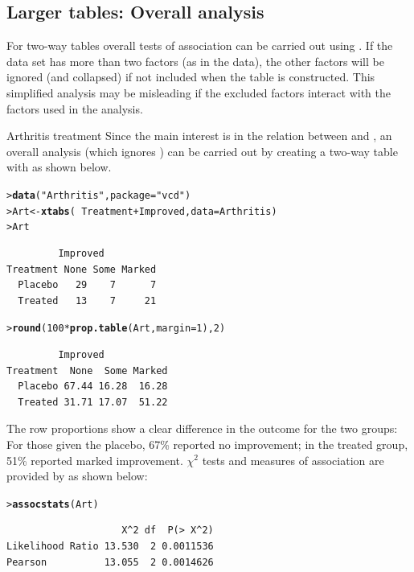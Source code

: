 \documentclass[10pt,krantz2]{krantz}\usepackage[]{graphicx}\usepackage[]{color}
\makeatletter
\newcommand{\hlnum}[1]{\textcolor[rgb]{0.686,0.059,0.569}{#1}}%
\newcommand{\hlstr}[1]{\textcolor[rgb]{0.192,0.494,0.8}{#1}}%
\newcommand{\hlopt}[1]{\textcolor[rgb]{0,0,0}{#1}}%
\newcommand{\hlstd}[1]{\textcolor[rgb]{0.345,0.345,0.345}{#1}}%
\newcommand{\hlkwb}[1]{\textcolor[rgb]{0.69,0.353,0.396}{#1}}%
\newcommand{\hlkwc}[1]{\textcolor[rgb]{0.333,0.667,0.333}{#1}}%
\newcommand{\hlkwd}[1]{\textcolor[rgb]{0.737,0.353,0.396}{\textbf{#1}}}%
\newenvironment{kframe}{%
 \def\at@end@of@kframe{}%
 \ifinner\ifhmode%
  \def\at@end@of@kframe{\end{minipage}}%
  \begin{minipage}{\columnwidth}%
 \fi\fi%
 \def\FrameCommand##1{\hskip\@totalleftmargin \hskip-\fboxsep
 \colorbox{shadecolor}{##1}\hskip-\fboxsep
     \hskip-\linewidth \hskip-\@totalleftmargin \hskip\columnwidth}%
 \MakeFramed {\advance\hsize-\width
   \@totalleftmargin\z@ \linewidth\hsize
   \@setminipage}}%
 {\par\unskip\endMakeFramed%
 \at@end@of@kframe}
\newenvironment{knitrout}{}{} %
\renewenvironment{knitrout}{\small\renewcommand{\baselinestretch}{.85}}{} %
\makeatother
\begin{document}
\subsection{Larger tables: Overall analysis}\label{sec:twoway-overall}

For two-way tables overall tests of association can be carried out
using .
If the data set has more than two factors (as in the
 data), the other factors will be
ignored (and collapsed) if not included when the table is constructed.
This simplified analysis may be misleading if
the excluded factors interact with the factors used in the
analysis.

\begin{Example}[arthrit2]{Arthritis treatment}
Since the main interest is in the relation between  and
, an overall analysis (which ignores ) can be carried out
by creating a two-way table with 
as shown below.
\begin{knitrout}
\color{fgcolor}\begin{kframe}
\begin{alltt}
\hlstd{> }\hlkwd{data}\hlstd{(}\hlstr{"Arthritis"}\hlstd{,} \hlkwc{package}\hlstd{=}\hlstr{"vcd"}\hlstd{)}
\hlstd{> }\hlstd{Art} \hlkwb{<-} \hlkwd{xtabs}\hlstd{(}\hlopt{~} \hlstd{Treatment} \hlopt{+} \hlstd{Improved,} \hlkwc{data} \hlstd{= Arthritis)}
\hlstd{> }\hlstd{Art}
\end{alltt}
\begin{verbatim}
         Improved
Treatment None Some Marked
  Placebo   29    7      7
  Treated   13    7     21
\end{verbatim}
\begin{alltt}
\hlstd{> }\hlkwd{round}\hlstd{(}\hlnum{100} \hlopt{*} \hlkwd{prop.table}\hlstd{(Art,} \hlkwc{margin} \hlstd{=} \hlnum{1}\hlstd{),} \hlnum{2}\hlstd{)}
\end{alltt}
\begin{verbatim}
         Improved
Treatment  None  Some Marked
  Placebo 67.44 16.28  16.28
  Treated 31.71 17.07  51.22
\end{verbatim}
\end{kframe}
\end{knitrout}
The row proportions show a clear difference in the outcome for the two groups:
For those given the placebo, 67\% reported no improvement;
in the treated group, 51\% reported marked improvement.  $\chi^2$ tests
and measures of association are provided by  as shown below:
\begin{knitrout}
\color{fgcolor}\begin{kframe}
\begin{alltt}
\hlstd{> }\hlkwd{assocstats}\hlstd{(Art)}
\end{alltt}
\begin{verbatim}
                    X^2 df  P(> X^2)
Likelihood Ratio 13.530  2 0.0011536
Pearson          13.055  2 0.0014626


\end{verbatim}
\end{kframe}
\end{knitrout}
\end{Example}
\end{document}

